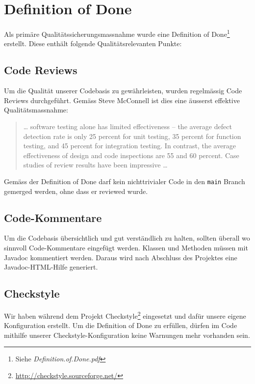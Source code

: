 \documentclass[10pt,a4paper]{scrartcl}
\begin{document}
\section{Definition of Done}

Als primäre Qualitätssicherungsmassnahme wurde eine Definition of Done\footnote{Siehe
\textit{Definition.of.Done.pdf}} erstellt. Diese enthält folgende Qualitätsrelevanten Punkte:

\subsection{Code Reviews}

Um die Qualität unserer Codebasis zu gewährleisten, wurden regelmässig Code Reviews
durchgeführt. Gemäss Steve McConnell \cite{mcconnell2005code} ist dies eine äusserst effektive
Qualitätsmassnahme:

\begin{quote}
	\ldots{} software testing alone has limited effectiveness -- the average defect detection rate is only 25
	percent for unit testing, 35 percent for function testing, and 45 percent for integration testing.
	In contrast, the average effectiveness of design and code inspections are 55 and 60 percent. Case
	studies of review results have been impressive \ldots
\end{quote}

Gemäss der Definition of Done darf kein nichttrivialer Code in den \texttt{main} Branch gemerged
werden, ohne dass er reviewed wurde.

\subsection{Code-Kommentare}

Um die Codebasis übersichtlich und gut verständlich zu halten, sollten überall wo sinnvoll
Code-Kommentare eingefügt werden. Klassen und Methoden müssen mit Javadoc kommentiert werden. Daraus
wird nach Abschluss des Projektes eine Javadoc-HTML-Hilfe generiert.

\subsection{Checkstyle}

Wir haben während dem Projekt Checkstyle\footnote{\url{http://checkstyle.sourceforge.net/}}
eingesetzt und dafür unsere eigene Konfiguration erstellt. Um die Definition of Done zu erfüllen,
dürfen im Code mithilfe unserer Checkstyle-Konfiguration keine Warnungen mehr vorhanden sein.
\end{document}
